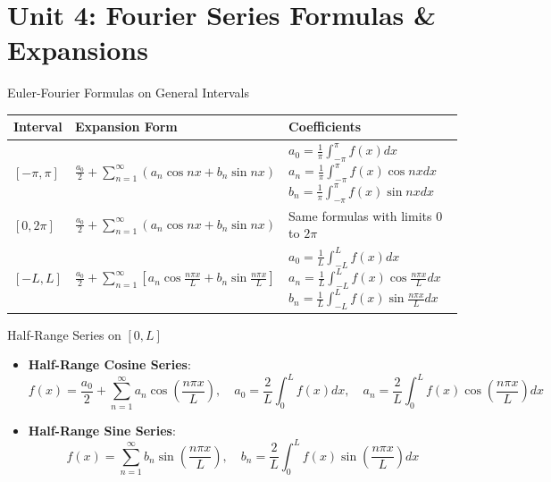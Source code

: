 \chapter{Unit 4: Fourier Series Formulas \& Expansions}

\begin{formulabox}{Euler-Fourier Formulas on General Intervals}
\begin{center}
\begin{tabularx}{\textwidth}{l X X}
\toprule
\textbf{Interval} & \textbf{Expansion Form} & \textbf{Coefficients} \\
\midrule
$[-\pi, \pi]$ & $\frac{a_0}{2} + \sum_{n=1}^\infty (a_n \cos nx + b_n \sin nx)$ & $a_0 = \frac{1}{\pi}\int_{-\pi}^\pi f(x)dx$ \newline $a_n = \frac{1}{\pi}\int_{-\pi}^\pi f(x)\cos nx dx$ \newline $b_n = \frac{1}{\pi}\int_{-\pi}^\pi f(x)\sin nx dx$ \\
\addlinespace
$[0, 2\pi]$ & $\frac{a_0}{2} + \sum_{n=1}^\infty (a_n \cos nx + b_n \sin nx)$ & Same formulas with limits $0$ to $2\pi$ \\
\addlinespace
$[-L, L]$ & $\frac{a_0}{2} + \sum_{n=1}^\infty \left[ a_n \cos\frac{n\pi x}{L} + b_n \sin\frac{n\pi x}{L} \right]$ & $a_0 = \frac{1}{L}\int_{-L}^L f(x)dx$ \newline $a_n = \frac{1}{L}\int_{-L}^L f(x)\cos\frac{n\pi x}{L} dx$ \newline $b_n = \frac{1}{L}\int_{-L}^L f(x)\sin\frac{n\pi x}{L} dx$ \\
\bottomrule
\end{tabularx}
\end{center}
\end{formulabox}

\begin{formulabox}{Half-Range Series on $[0, L]$}
\begin{itemize}
    \item \textbf{Half-Range Cosine Series}:
    \begin{equation*}
    f(x) = \frac{a_0}{2} + \sum_{n=1}^\infty a_n \cos\left(\frac{n\pi x}{L}\right), \quad a_0 = \frac{2}{L}\int_0^L f(x)dx, \quad a_n = \frac{2}{L}\int_0^L f(x)\cos\left(\frac{n\pi x}{L}\right)dx
    \end{equation*}
    \item \textbf{Half-Range Sine Series}:
    \begin{equation*}
    f(x) = \sum_{n=1}^\infty b_n \sin\left(\frac{n\pi x}{L}\right), \quad b_n = \frac{2}{L}\int_0^L f(x)\sin\left(\frac{n\pi x}{L}\right)dx
    \end{equation*}
\end{itemize}
\end{formulabox}

